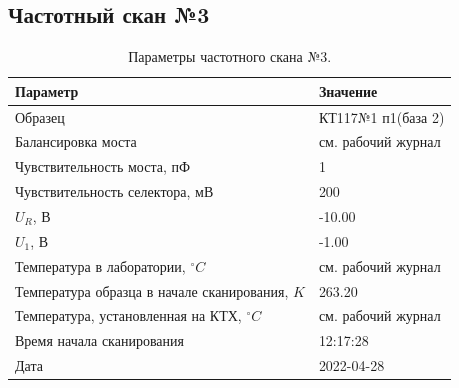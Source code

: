 \subsection{Частотный скан №3}
\begin{table}[!ht]
    \centering
    \caption{Параметры частотного скана №3.}
    \begin{tabular}{|l|l|}
        \hline
        Параметр                                       & Значение                  \\ \hline
        Образец                                        & КТ117№1 п1(база 2)        \\ \hline
        Балансировка моста                             & см. рабочий журнал        \\ \hline
        Чувствительность моста, пФ                     & 1                         \\ \hline
        Чувствительность селектора, мВ                 & 200                       \\ \hline
        $U_R$, В                                       & -10.00                    \\ \hline
        $U_1$, В                                       & -1.00                     \\ \hline
        Температура в лаборатории, $^\circ C$          & см. рабочий журнал        \\ \hline
        Температура образца в начале сканирования, $K$ & 263.20                    \\ \hline
        Температура, установленная на КТХ, $^\circ C$  & см. рабочий журнал        \\ \hline
        Время начала сканирования                      & 12:17:28                  \\ \hline
        Дата                                           & 2022-04-28                \\ \hline
    \end{tabular}
    \label{table:frequency_scan_3}
\end{table}

